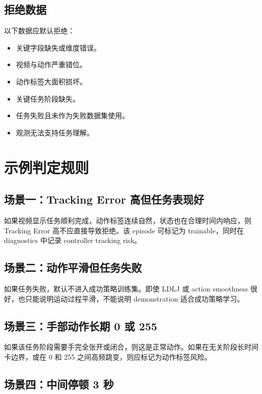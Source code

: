 \documentclass[UTF8,zihao=-4]{ctexart}
\begin{document}
\subsection{拒绝数据}

以下数据应默认拒绝：

\begin{itemize}
  \item 关键字段缺失或维度错误。
  \item 视频与动作严重错位。
  \item 动作标签大面积损坏。
  \item 关键任务阶段缺失。
  \item 任务失败且未作为失败数据集使用。
  \item 观测无法支持任务理解。
\end{itemize}

\section{示例判定规则}

\subsection{场景一：Tracking Error 高但任务表现好}

如果视频显示任务顺利完成，动作标签连续自然，状态也在合理时间内响应，则 Tracking Error 高不应直接导致拒绝。该 episode 可标记为 trainable，同时在 diagnostics 中记录 controller tracking risk。

\subsection{场景二：动作平滑但任务失败}

如果任务失败，默认不进入成功策略训练集。即使 LDLJ 或 action smoothness 很好，也只能说明运动过程平滑，不能说明 demonstration 适合成功策略学习。

\subsection{场景三：手部动作长期 0 或 255}

如果该任务阶段需要手完全张开或闭合，则这是正常动作。如果在无关阶段长时间卡边界，或在 0 和 255 之间高频跳变，则应标记为动作标签风险。

\subsection{场景四：中间停顿 3 秒}
\end{document}
